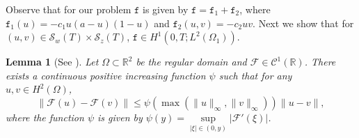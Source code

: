 \documentclass[11pt]{article}
\newtheorem{lemma}[theorem]{Lemma}
\begin{document}
Observe that for our problem $\mathtt{f}$ is given by $\mathtt{f} = \mathtt{f}_1 +\mathtt{f}_2$, where $\mathtt{f}_1(u)=-c_1u(a-u)(1-u)$ and $\mathtt{f}_2(u, v)=-c_2uv$. Next we show that for $(u, v)\in \mathcal{S}_w(T) \times \mathcal{S}_z(T)$, $\mathtt{f} \in H^1(0,T; L^2(\Omega_1))$.
\begin{lemma}[See \cite{caetano2010schwarz}]\label{lemma_ex}
Let $\Omega \subset \mathbb{R}^2$ be the regular domain and $\mathcal{F}\in \mathcal{C}^1(\mathbb{R})$. There exists a continuous positive increasing function $\psi$ such that for any $u, v\in H^2(\Omega)$,
\[
\parallel \mathcal{F}(u) -\mathcal{F}(v)\parallel \leq \psi(\max(\parallel u\parallel_{\infty}, \parallel v\parallel_{\infty})) \parallel u -v\parallel,
\]
where the function $\psi$ is given by $\psi(y) = \sup\limits_{\vert\xi\vert\in(0, y)} \vert \mathcal{F}'(\xi)\vert$.  
\end{lemma}
\end{document}
